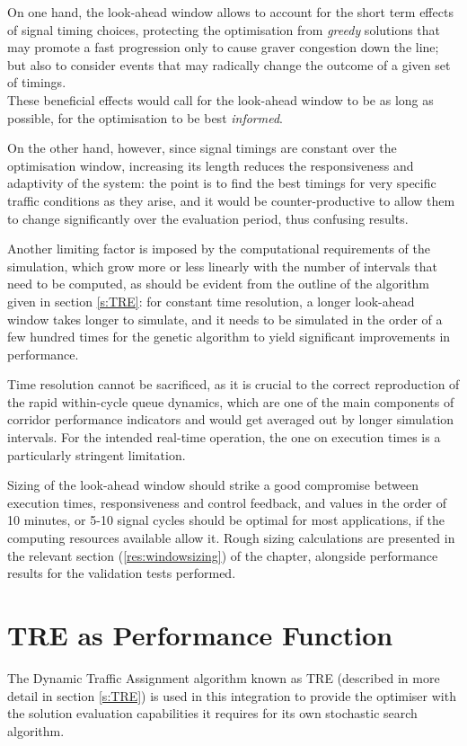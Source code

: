 On one hand, the look-ahead window allows to account for the short term effects of signal timing choices, protecting the optimisation from \emph{greedy} solutions that may promote a fast progression only to cause graver congestion down the line; but also to consider events that may radically change the outcome of a given set of timings.\\
These beneficial effects would call for the look-ahead window to be as long as possible, for the optimisation to be best \emph{informed}.

On the other hand, however, since signal timings are constant over the optimisation window, increasing its length reduces the responsiveness and adaptivity of the system: the point is to find the best timings for very specific traffic conditions as they arise, and it would be counter-productive to allow them to change significantly over the evaluation period, thus confusing results.

Another limiting factor is imposed by the computational requirements of the simulation, which grow more or less linearly with the number of intervals that need to be computed, as should be evident from the outline of the algorithm given in section \ref{s:TRE}: for constant time resolution, a longer look-ahead window takes longer to simulate, and it needs to be simulated in the order of a few hundred times for the genetic algorithm to yield significant improvements in performance. 

Time resolution cannot be sacrificed, as it is crucial to the correct reproduction of the rapid within-cycle queue dynamics, which are one of the main components of corridor performance indicators and would get averaged out by longer simulation intervals. For the intended real-time operation, the one on execution times is a particularly stringent limitation.

Sizing of the look-ahead window should strike a good compromise between execution times, responsiveness and control feedback, and values in the order of 10 minutes, or 5-10 signal cycles should be optimal for most applications, if the computing resources available allow it.
Rough sizing calculations are presented in the relevant section (\ref{res:windowsizing}) of the  chapter, alongside performance results for the validation tests performed.

\section{TRE as Performance Function} \label{s:rollingtre}
The Dynamic Traffic Assignment algorithm known as TRE (described in more detail in section \ref{s:TRE}) is used in this integration to provide the optimiser with the solution evaluation capabilities it requires for its own stochastic search algorithm.

